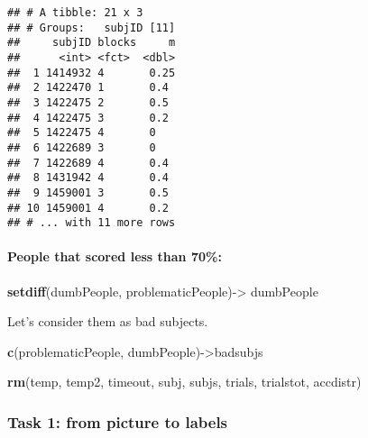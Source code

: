 \documentclass[
]{article}
\newenvironment{Shaded}{\begin{snugshade}}{\end{snugshade}}
\newcommand{\DecValTok}[1]{\textcolor[rgb]{0.00,0.00,0.81}{#1}}
\newcommand{\KeywordTok}[1]{\textcolor[rgb]{0.13,0.29,0.53}{\textbf{#1}}}
\newcommand{\NormalTok}[1]{#1}
\newcommand{\OperatorTok}[1]{\textcolor[rgb]{0.81,0.36,0.00}{\textbf{#1}}}
\newcommand{\StringTok}[1]{\textcolor[rgb]{0.31,0.60,0.02}{#1}}
\begin{document}
\begin{verbatim}
## # A tibble: 21 x 3
## # Groups:   subjID [11]
##     subjID blocks     m
##      <int> <fct>  <dbl>
##  1 1414932 4       0.25
##  2 1422470 1       0.4 
##  3 1422475 2       0.5 
##  4 1422475 3       0.2 
##  5 1422475 4       0   
##  6 1422689 3       0   
##  7 1422689 4       0.4 
##  8 1431942 4       0.4 
##  9 1459001 3       0.5 
## 10 1459001 4       0.2 
## # ... with 11 more rows
\end{verbatim}

\hypertarget{people-that-scored-less-than-70}{%
\paragraph{People that scored less than
70\%:}\label{people-that-scored-less-than-70}}

\begin{Shaded}
\end{Shaded}

\begin{Shaded}
\begin{Highlighting}[]
\KeywordTok{setdiff}\NormalTok{(dumbPeople, problematicPeople)->}\StringTok{ }\NormalTok{dumbPeople}
\end{Highlighting}
\end{Shaded}

Let's consider them as bad subjects.

\begin{Shaded}
\begin{Highlighting}[]
\KeywordTok{c}\NormalTok{(problematicPeople, dumbPeople)->badsubjs}
\end{Highlighting}
\end{Shaded}

\begin{Shaded}
\begin{Highlighting}[]
\KeywordTok{rm}\NormalTok{(temp, temp2, timeout, subj, subjs, trials, trialstot, accdistr)}
\end{Highlighting}
\end{Shaded}

\hypertarget{task-1-from-picture-to-labels}{%
\subsubsection{Task 1: from picture to
labels}\label{task-1-from-picture-to-labels}}
\end{document}
